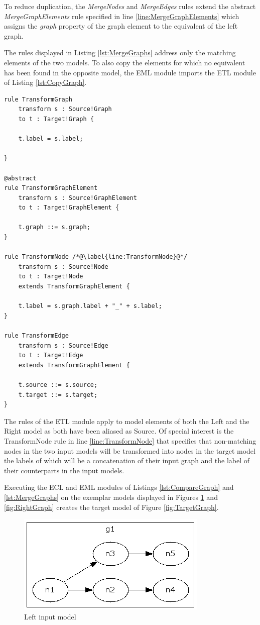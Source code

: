 To reduce duplication, the \emph{MergeNodes} and \emph{MergeEdges} rules extend the abstract \emph{MergeGraphElements} rule specified in line \ref{line:MergeGraphElements} which assigns the \emph{graph} property of the graph element to the equivalent of the left graph.

The rules displayed in Listing \ref{lst:MergeGraphs} address only the matching elements of the two models. To also copy the elements for which no equivalent has been found in the opposite model, the EML module imports the ETL module of Listing \ref{lst:CopyGraph}.

\begin{lstlisting}[float=tbp, caption=The Graphs.etl ETL transformation module, label=lst:CopyGraph, language=ETL]
rule TransformGraph 
	transform s : Source!Graph
	to t : Target!Graph {
	
	t.label = s.label;
	
}

@abstract
rule TransformGraphElement 
	transform s : Source!GraphElement
	to t : Target!GraphElement {
	
	t.graph ::= s.graph;
}

rule TransformNode /*@\label{line:TransformNode}@*/
	transform s : Source!Node
	to t : Target!Node 
	extends TransformGraphElement {
	
	t.label = s.graph.label + "_" + s.label;
}

rule TransformEdge 
	transform s : Source!Edge
	to t : Target!Edge 
	extends TransformGraphElement {
	
	t.source ::= s.source;
	t.target ::= s.target;	
} 
\end{lstlisting}

The rules of the ETL module apply to model elements of both the Left and the Right model as both have been aliased as Source. Of special interest is the TransformNode rule in line \ref{line:TransformNode} that specifies that non-matching nodes in the two input models will be transformed into nodes in the target model the labels of which will be a concatenation of their input graph and the label of their counterparts in the input models.

Executing the ECL and EML modules of Listings \ref{lst:CompareGraph} and \ref{lst:MergeGraphs} on the exemplar models displayed in Figures \ref{fig:LeftGraph} and \ref{fig:RightGraph} creates the target model of Figure \ref{fig:TargetGraph}.

\begin{figure}
	\centering
		\includegraphics{images/LeftGraph.png}
	\caption{Left input model}
	\label{fig:LeftGraph}
\end{figure}


